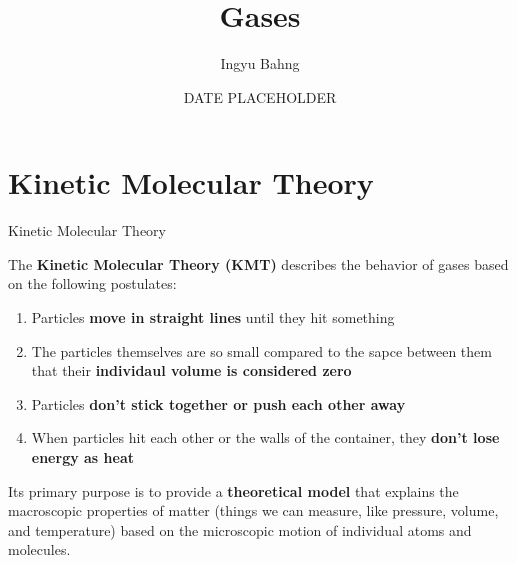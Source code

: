 \documentclass[10pt]{article}
\title{Gases}
\date{DATE PLACEHOLDER}
\author{Ingyu Bahng}
\begin{document}


\section{Kinetic Molecular Theory}

  \begin{core}{Kinetic Molecular Theory}

    The \textbf{Kinetic Molecular Theory (KMT)} describes the behavior of gases based on the following postulates:

    \begin{enumerate}

      \item Particles \textbf{move in straight lines} until they hit something

      \item The particles themselves are so small compared to the sapce between them that their \textbf{individaul volume is considered zero}

      \item Particles \textbf{don't stick together or push each other away}

      \item When particles hit each other or the walls of the container, they \textbf{don't lose energy as heat}
          
    \end{enumerate}

    Its primary purpose is to provide a \textbf{theoretical model} that explains the macroscopic properties of matter (things we can measure, like pressure, volume, and temperature) based on the microscopic motion of individual atoms and molecules.

  \end{core}
 
\end{document}
